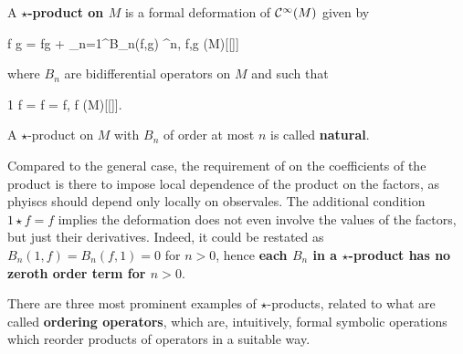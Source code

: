 \begin{definition}
	A \textbf{$\star$-product on $M$} is a formal deformation of $\mathcal{C}^\infty(M)$ given by
	\begin{eqalign}
		f \star g = fg + \sum_{n=1}^\infty B_n(f,g) \planck^n, \quad f,g \in \Cinfty(M)[[\planck]]
	\end{eqalign}
	where $B_n$ are bidifferential operators on $M$ and such that
	\begin{eqalign}
	\label{eq:star_pr_id_axiom}
		1 \star f = f  = f, \quad \forall f \in \Cinfty(M)[[\planck]].
	\end{eqalign}
	A $\star$-product on $M$ with $B_n$ of order at most $n$ is called \textbf{natural}.
\end{definition}

\begin{remark}
\label{rmk:no_zeroth_order}
	Compared to the general case, the requirement of on the coefficients of the product is there to impose local dependence of the product on the factors, as phyiscs should depend only locally on observales. The additional condition $1 \star f=f$ implies the deformation does not even involve the values of the factors, but just their derivatives. Indeed, it could be restated as $B_n(1,f) = B_n(f,1) =0$ for $n>0$, hence \textbf{each $B_n$ in a $\star$-product has no zeroth order term for $n > 0$}.
\end{remark}

There are three most prominent examples of $\star$-products, related to what are called \textbf{ordering operators}, which are, intuitively, formal symbolic operations which reorder products of operators in a suitable way.

